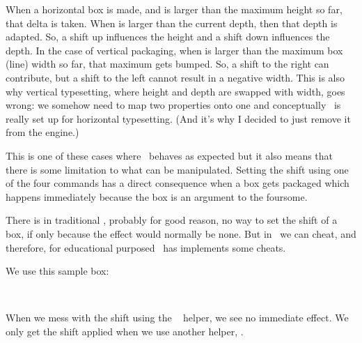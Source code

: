 \startitemize
    \startitem
        When a horizontal box is made, and  is larger than the
        maximum height so far, that delta is taken. When  is
        larger than the current depth, then that depth is adapted. So, a shift up
        influences the height and a shift down influences the depth.
    \stopitem
    \startitem
        In the case of vertical packaging, when  is larger
        than the maximum box (line) width so far, that maximum gets bumped. So, a
        shift to the right can contribute, but a shift to the left cannot result
        in a negative width. This is also why vertical typesetting, where height
        and depth are swapped with width, goes wrong: we somehow need to map two
        properties onto one and conceptually \TEX\ is really set up for
        horizontal typesetting. (And it's why I decided to just remove it from the
        engine.)
    \stopitem
\stopitemize

This is one of these cases where \TEX\ behaves as expected but it also means that
there is some limitation to what can be manipulated. Setting the shift using one
of the four commands has a direct consequence when a box gets packaged which
happens immediately because the box is an argument to the foursome.

There is in traditional \TEX, probably for good reason, no way to set the shift
of a box, if only because the effect would normally be none. But in \LUATEX\ we
can cheat, and therefore, for educational purposed \CONTEXT\ has implements
some cheats.

We use this sample box:

\startbuffer[demo]
\setbox\scratchbox\hbox\bgroup
    \middlegray\vrule width 20mm depth  -.5mm height 10mm
    \hskip-20mm
    \darkgray  \vrule width 20mm height -.5mm depth   5mm
\egroup
\stopbuffer

\typebuffer[demo][option=TEX]

When we mess with the shift using the \CONTEXT\ \type {\shiftbox} helper, we see
no immediate effect. We only get the shift applied when we use another helper,
\type {\hpackbox}.

\startbuffer
\hbox\bgroup
    \showstruts \strut
    \quad                            \copy\scratchbox
    \quad \shiftbox\scratchbox -20mm \copy\scratchbox
    \quad \hpackbox\scratchbox       \box \scratchbox
    \quad \strut
\egroup
\stopbuffer

\typebuffer[option=TEX]

